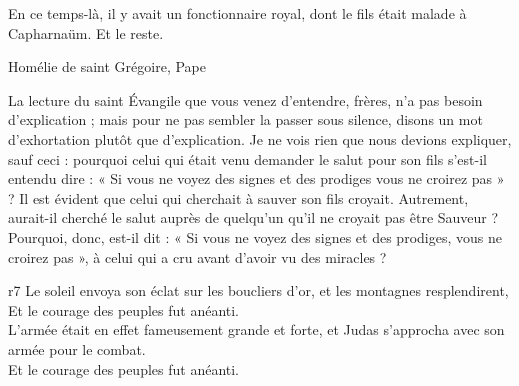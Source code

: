 \documentclass[twoside]{article}
\begin{document}
\begin{paracol}[1]{2}
{		
		
		En ce temps-là, il y avait un fonctionnaire royal, dont le fils était malade à Capharnaüm. Et le reste.
		
		Homélie de saint Grégoire, Pape
		
		
		La lecture du saint Évangile que vous venez d’entendre, frères, n’a pas besoin d’explication ; mais pour ne pas sembler la passer sous silence, disons un mot d’exhortation plutôt que d’explication. Je ne vois rien que nous devions expliquer, sauf ceci : pourquoi celui qui était venu demander le salut pour son fils s’est-il entendu dire : « Si vous ne voyez des signes et des prodiges vous ne croirez pas » ? Il est évident que celui qui cherchait à sauver son fils croyait. Autrement, aurait-il cherché le salut auprès de quelqu’un qu’il ne croyait pas être Sauveur ? Pourquoi, donc, est-il dit : « Si vous ne voyez des signes et des prodiges, vous ne croirez pas », à celui qui a cru avant d’avoir vu des miracles ?
	}
	{r7}
	{\rr Le soleil envoya son éclat sur les boucliers d'or, et les montagnes resplendirent,\\
	\GreSpecial{*} Et le courage des peuples fut anéanti.\\
	\vv L'armée était en effet fameusement grande et forte, et Judas s'approcha avec son armée pour le combat.\\
	\GreSpecial{*} Et le courage des peuples fut anéanti.}
	

\end{paracol}
\end{document}
